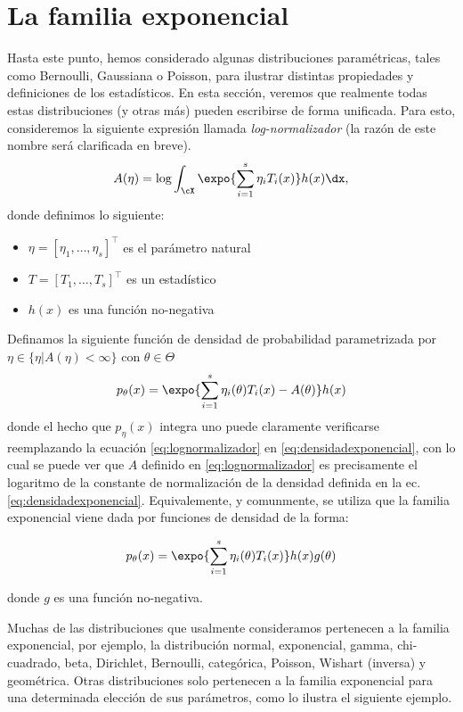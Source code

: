 \section{La familia exponencial}

Hasta este punto, hemos considerado algunas distribuciones paramétricas, tales como Bernoulli, Gaussiana o Poisson, para ilustrar distintas propiedades y definiciones de los estadísticos. En esta sección, veremos que realmente todas estas distribuciones (y otras más) pueden escribirse de forma unificada. Para esto, consideremos la siguiente expresión llamada \textit{log-normalizador} (la razón de este nombre será clarificada en breve).
\begin{equation}
	\label{eq:lognormalizador}
	A(\eta) = \log\int_\cX \expo{\sum_{i=1}^s\eta_iT_i(x)}h(x)\dx,
\end{equation}
donde definimos lo siguiente:
\begin{itemize}
	\item $\eta = [\eta_1,\ldots,\eta_s]^\top$ es el parámetro natural
	\item $T = [T_1,\ldots,T_s]^\top$ es un estadístico
	\item $h(x)$ es una función no-negativa
\end{itemize}

\begin{definition}
    Definamos la siguiente función de densidad de probabilidad parametrizada por $\eta\in\{\eta | A(\eta)<\infty\}$ con $\theta\in\Theta$
\begin{equation}
	\label{eq:densidadexponencial}
 	p_\theta(x) = \expo{\sum_{i=1}^s\eta_i(\theta)T_i(x)-A(\theta)}h(x)
 \end{equation} 
 donde el hecho que $p_\eta(x)$ integra uno puede claramente verificarse reemplazando la ecuación \eqref{eq:lognormalizador} en \eqref{eq:densidadexponencial}, con lo cual se puede ver que $A$ definido en \eqref{eq:lognormalizador} es precisamente el logaritmo de la constante de normalización de la densidad definida en la ec.~ \eqref{eq:densidadexponencial}. Equivalemente, y comunmente, se utiliza que la familia exponencial viene dada por funciones de densidad de la forma:
 
 \[p_\theta(x) = \expo{\sum_{i=1}^s\eta_i(\theta)T_i(x)}h(x)g(\theta)\]
 
 donde $g$ es una función no-negativa.
\end{definition}

 Muchas de las distribuciones que usalmente consideramos pertenecen a la familia exponencial, por ejemplo, la distribución normal, exponencial, gamma, chi-cuadrado, beta, Dirichlet, Bernoulli, categórica, Poisson, Wishart (inversa) y geométrica. Otras distribuciones solo pertenecen a la familia exponencial para una determinada elección de sus parámetros, como lo ilustra el siguiente ejemplo.

